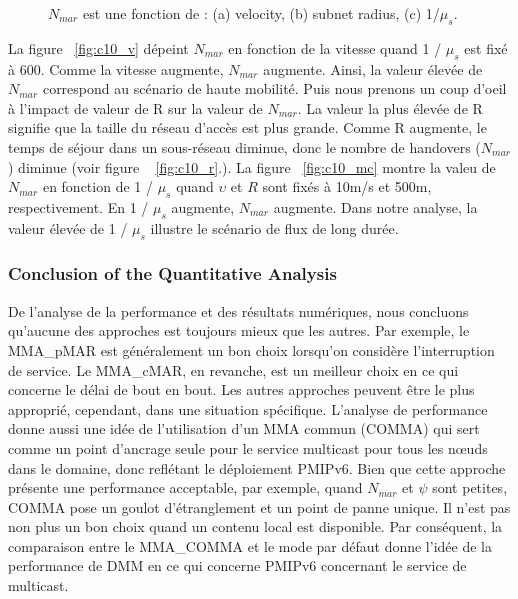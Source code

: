 \begin{figure}[h!]
\centering
{}
\caption[Expected number of handovers.]{$N_{mar}$ est une fonction de : (a) velocity, (b) subnet radius, (c) 1/$\mu_{s}$.}
\label{fig:c10_n_mar}
\end{figure}

La figure ~\ref{fig:c10_v} dépeint $ N_{mar} $ en fonction de la vitesse quand 1 / $\mu_{s} $ est fixé à 600. Comme la vitesse augmente, $ N_{mar} $ augmente. Ainsi, la valeur élevée de $ N_{mar} $ correspond au scénario de haute mobilité. Puis nous prenons un coup d'oeil à l'impact de valeur de R sur la valeur de $ N_{mar} $. La valeur la plus élevée de R signifie que la taille du réseau d'accès est plus grande. Comme R augmente, le temps de séjour dans un sous-réseau diminue, donc le nombre de handovers ($ N_{mar} $) diminue (voir figure ~ \ref{fig:c10_r}.). La figure ~\ref{fig:c10_mc} montre la valeu de $ N_{mar} $ en fonction de 1 / $ \mu_{s} $ quand $ \upsilon $ et $ R $ sont fixés à 10m/s et 500m, respectivement. En 1 / $ \mu_{s}$ augmente, $N_{mar} $ augmente. Dans notre analyse, la valeur élevée de 1 / $ \mu_{s} $ illustre le scénario de flux de long durée.

\subsubsection{Conclusion of the Quantitative Analysis}
De l'analyse de la performance et des résultats numériques, nous concluons qu'aucune des approches est toujours mieux que les autres. Par exemple, le MMA\_pMAR est généralement un bon choix lorsqu'on considère l'interruption de service. Le MMA\_cMAR, en revanche, est un meilleur choix en ce qui concerne le délai de bout en bout. Les autres approches peuvent être le plus approprié, cependant, dans une situation spécifique. L'analyse de performance donne aussi une idée de l'utilisation d'un MMA commun (COMMA) qui sert comme un point d'ancrage seule ​​pour le service multicast pour tous les nœuds dans le domaine, donc reflétant le déploiement PMIPv6. Bien que cette approche présente une performance acceptable, par exemple, quand $ N_{mar} $ et $ \psi $ sont petites, COMMA pose un goulot d'étranglement et un point de panne unique. Il n'est pas non plus un bon choix quand un contenu local est disponible. Par conséquent, la comparaison entre le MMA\_COMMA et le mode par défaut donne l'idée de la performance de DMM en ce qui concerne PMIPv6 concernant le service de multicast.

